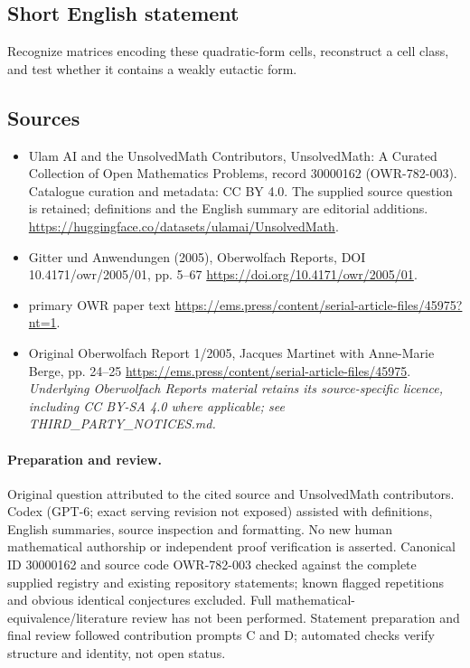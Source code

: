 \documentclass[11pt]{article}
\begin{document}
\subsection{Short English statement}
Recognize matrices encoding these quadratic-form cells, reconstruct a cell class, and test whether it contains a weakly eutactic form.
\subsection{Sources}
\begin{itemize}
\item[\hypertarget{source:30000162:1}{S1}] Ulam AI and the UnsolvedMath Contributors, UnsolvedMath: A Curated Collection of Open Mathematics Problems, record 30000162 (OWR-782-003). Catalogue curation and metadata: CC BY 4.0. The supplied source question is retained; definitions and the English summary are editorial additions.
\url{https://huggingface.co/datasets/ulamai/UnsolvedMath}.
\item[\hypertarget{source:30000162:2}{S2}] Gitter und Anwendungen (2005), Oberwolfach Reports, DOI 10.4171/owr/2005/01, pp. 5--67
\url{https://doi.org/10.4171/owr/2005/01}.
\item[\hypertarget{source:30000162:3}{S3}] primary OWR paper text
\url{https://ems.press/content/serial-article-files/45975?nt=1}.
\item[\hypertarget{source:30000162:4}{S4}] Original Oberwolfach Report 1/2005, Jacques Martinet with Anne-Marie Berge, pp. 24--25
\url{https://ems.press/content/serial-article-files/45975}.
\textit{Underlying Oberwolfach Reports material retains its source-specific licence, including CC BY-SA 4.0 where applicable; see THIRD\_PARTY\_NOTICES.md.}
\end{itemize}
\paragraph{Preparation and review.}
Original question attributed to the cited source and UnsolvedMath contributors. Codex (GPT-6; exact serving revision not exposed) assisted with definitions, English summaries, source inspection and formatting. No new human mathematical authorship or independent proof verification is asserted. Canonical ID 30000162 and source code OWR-782-003 checked against the complete supplied registry and existing repository statements; known flagged repetitions and obvious identical conjectures excluded. Full mathematical-equivalence/literature review has not been performed. Statement preparation and final review followed contribution prompts C and D; automated checks verify structure and identity, not open status.
\label{end:30000162}
\end{document}
